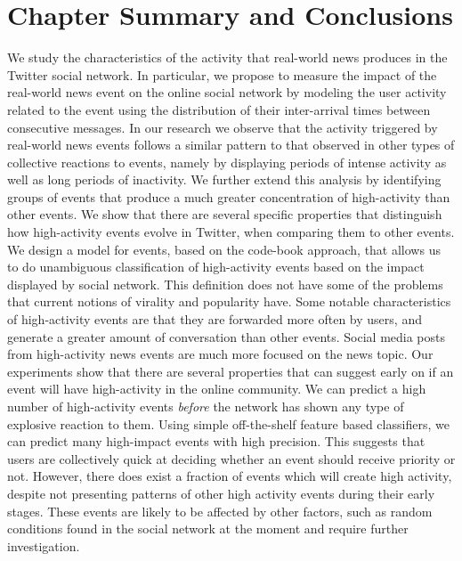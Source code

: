 \section{Chapter Summary and Conclusions}

We study the characteristics of the activity that real-world news produces in
the Twitter social network. 
%
In particular, we propose to measure the impact of the real-world news event on
the online social network by modeling the user activity related to the event
using the distribution of their inter-arrival times between consecutive messages.
%
In our research we observe that the activity triggered by real-world news events
follows a similar pattern to that observed in other types of collective
reactions to events, 
%
namely by displaying periods of intense activity as well as long periods of
inactivity.
%
We further extend this analysis by identifying groups of events that produce
a much greater concentration of high-activity than other events. 
%
We show that there are several specific properties that distinguish how
high-activity events evolve in Twitter, when comparing them to other events. 
%
We design a model for events, based on the code-book approach, that allows us to
do unambiguous classification of high-activity events based on the impact
displayed by social network. 
%
This definition does not have some of the problems that current notions of
virality and popularity have. 
%
Some notable characteristics of high-activity events are that they are forwarded
more often by users, and generate a greater amount of conversation than other
events.
%
Social media posts from high-activity news events are much more focused on the
news topic. 
%
Our experiments show that there are several properties that can suggest early on
if an event will have high-activity in the online community. 
%
We can predict a high number of high-activity events {\em before} the network
has shown any type of explosive reaction to them. 
%
Using simple off-the-shelf feature based classifiers, we can predict many
high-impact events with high precision. 
%
This suggests that users are collectively quick at deciding whether an event
should receive priority or not. 
%
However, there does exist a fraction of events which will create high activity,
despite not presenting patterns of other high activity events during their early
stages.
%
These events are likely to be affected by other factors, such as random
conditions found in the social network at the moment and require further
investigation.
